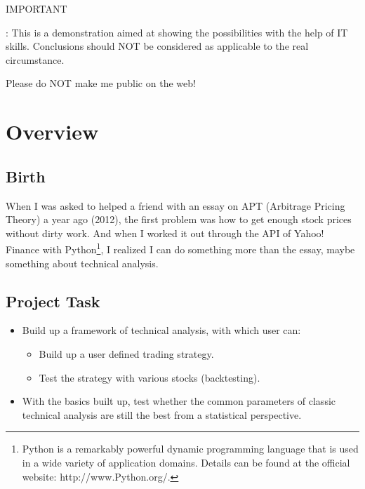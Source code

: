 \documentclass[12pt,a4paper]{article}
\begin{document}
\begin{framed}
	\begin{large}IMPORTANT\end{large}:
	This is a demonstration aimed at showing the possibilities
	with the help of IT skills. 
	Conclusions should NOT be considered as applicable to the real 
	circumstance\footnotemark.
	\bigskip
	
	Please do NOT make me public on the web!
\end{framed}



\section{Overview}

\subsection{Birth}
When I was asked to helped a friend with an essay on 
APT (Arbitrage Pricing Theory) a year ago (2012),
the first problem was how to get enough stock prices without dirty work.
And when I worked it out through the API of Yahoo! Finance with 
Python\footnote{Python is a remarkably powerful dynamic programming language 
that is used in a wide variety of application domains. Details
can be found at the official website: http://www.Python.org/.},
I realized I can do something more than the essay, maybe something about 
technical analysis.

\subsection{Project Task}
\begin{itemize}[itemsep=0pt]
\item Build up a framework of technical analysis, with which user can:
	\begin{itemize}[nosep]
	\item Build up a user defined trading strategy.
	\item Test the strategy with various stocks (backtesting).
	\end{itemize}
\item With the basics built up, test whether the common parameters of classic 
technical analysis are still the best from a statistical perspective.
\end{itemize}
\end{document}

